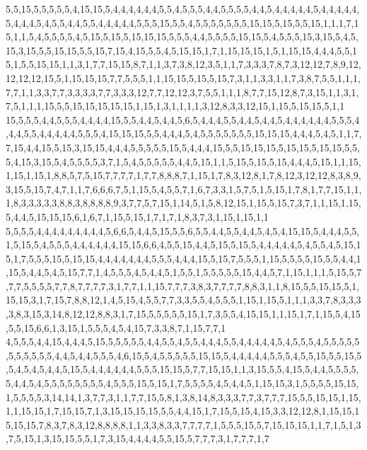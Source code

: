 5,5,15,5,5,5,5,5,4,15,15,5,4,4,4,4,4,4,5,5,4,5,5,5,4,4,5,5,5,5,4,4,5,4,4,4,4,4,5,4,4,4,4,4,5,4,4,4,5,4,5,5,4,4,5,5,4,4,4,4,4,5,5,5,15,5,5,4,5,5,5,5,5,5,5,15,15,5,15,5,5,15,1,1,1,7,15,1,1,5,4,5,5,5,5,4,5,15,5,15,5,15,15,15,5,5,5,4,4,5,5,5,5,15,15,5,4,5,5,5,15,3,15,5,4,5,15,3,15,5,5,15,15,5,5,15,7,15,4,15,5,5,4,5,15,15,1,7,1,15,15,15,1,5,1,15,15,4,4,4,5,5,15,1,5,5,15,15,1,1,3,1,7,7,15,15,8,7,1,1,3,7,3,8,12,3,5,1,1,7,3,3,3,7,8,7,3,12,12,7,8,9,12,12,12,12,15,5,1,15,15,15,7,7,5,5,5,1,1,15,15,5,15,5,15,7,3,1,1,3,3,1,1,7,3,8,7,5,5,1,1,1,7,7,1,1,3,3,7,7,3,3,3,3,7,7,3,3,3,12,7,7,12,12,3,7,5,5,1,1,1,8,7,7,15,12,8,7,3,15,1,1,3,1,7,5,1,1,1,15,5,5,15,15,15,15,15,1,15,1,3,1,1,1,1,3,12,8,3,3,12,15,1,15,5,15,15,5,1,1
15,5,5,5,4,4,5,5,5,4,4,4,4,15,5,5,4,4,5,4,4,5,6,5,4,4,4,5,5,4,4,5,4,4,5,4,4,4,4,4,4,5,5,5,4,4,4,5,5,4,4,4,4,4,5,5,5,4,15,15,15,5,5,4,4,4,5,4,5,5,5,5,5,5,5,15,15,15,4,4,4,5,4,5,1,1,7,7,15,4,4,15,5,15,3,15,15,4,4,4,5,5,5,5,5,15,5,4,4,4,15,5,5,15,15,15,5,15,15,5,15,15,5,5,5,4,15,3,15,5,4,5,5,5,5,3,7,1,5,4,5,5,5,5,5,4,4,5,15,1,1,5,15,5,15,5,15,4,4,4,5,15,1,1,15,1,15,1,15,1,8,8,5,7,5,15,7,7,7,7,1,7,7,8,8,8,7,1,15,1,7,8,3,12,8,1,7,8,12,3,12,12,8,3,8,9,3,15,5,15,7,4,7,1,1,7,6,6,6,7,5,1,15,5,4,5,5,7,1,6,7,3,3,1,5,7,5,1,5,15,1,7,8,1,7,7,15,1,1,1,8,3,3,3,3,3,8,8,3,8,8,8,8,9,3,7,7,5,7,15,1,14,5,1,5,8,12,15,1,15,5,15,7,3,7,1,1,15,1,15,5,4,4,5,15,15,15,6,1,6,7,1,15,5,15,1,7,1,7,1,8,3,7,3,1,15,1,15,1,1
5,5,5,5,4,4,4,4,4,4,4,4,4,5,6,6,5,4,4,5,15,5,5,6,5,5,4,4,5,5,4,4,5,4,5,4,15,15,5,4,4,4,5,5,1,5,15,5,4,5,5,5,4,4,4,4,4,4,15,15,6,6,4,5,5,15,4,4,5,15,5,15,5,4,4,4,4,4,5,4,5,5,4,5,15,15,1,7,5,5,5,15,5,15,15,4,4,4,4,4,4,4,5,5,5,4,4,4,15,5,15,7,5,5,5,1,15,5,5,5,5,15,5,5,4,4,1,15,5,4,4,5,4,5,15,7,7,1,4,5,5,5,4,5,4,4,5,1,5,5,1,5,5,5,5,5,15,4,4,5,7,1,15,1,1,1,5,15,5,7,7,7,5,5,5,5,7,7,8,7,7,7,7,3,1,7,7,1,1,15,7,7,7,3,8,3,7,7,7,7,8,8,3,1,1,8,15,5,5,15,15,5,1,15,15,3,1,7,15,7,8,8,12,1,4,5,15,4,5,5,7,7,3,3,5,5,4,5,5,5,1,15,1,15,5,1,1,1,3,3,7,8,3,3,3,3,8,3,15,3,14,8,12,12,8,8,3,1,7,15,5,5,5,5,5,15,1,7,3,5,5,4,15,15,1,1,15,1,7,1,15,5,4,15,5,5,15,6,6,1,3,15,1,5,5,5,4,5,4,15,7,3,3,8,7,1,15,7,7,1
4,5,5,5,4,4,15,4,4,4,5,15,5,5,5,5,5,4,4,5,5,4,5,5,4,4,4,5,5,4,4,4,4,4,5,4,5,5,5,4,5,5,5,5,5,5,5,5,5,5,5,4,4,5,4,4,5,5,5,4,6,15,5,4,5,5,5,5,5,15,15,5,4,4,4,4,4,5,5,5,4,5,5,15,5,5,15,5,5,4,5,4,5,4,4,5,15,5,4,4,4,4,4,4,5,5,5,15,15,5,7,7,15,15,1,1,3,15,5,5,4,15,5,4,4,5,5,5,5,5,4,4,5,4,5,5,5,5,5,5,5,5,4,5,5,5,15,5,15,1,7,5,5,5,5,4,5,4,4,5,1,15,15,3,1,5,5,5,5,15,15,1,5,5,5,5,3,14,14,1,3,7,7,3,1,1,7,7,15,5,8,1,3,8,14,8,3,3,3,7,7,3,7,7,7,15,5,5,15,15,1,15,1,1,15,15,1,7,15,15,7,1,3,15,15,15,15,5,5,4,4,15,1,7,15,5,15,4,15,3,3,12,12,8,1,15,15,15,15,15,7,8,3,7,8,3,12,8,8,8,8,1,1,3,3,8,3,3,7,7,7,7,1,5,5,5,15,5,7,15,15,15,1,1,7,1,5,1,3,7,5,15,1,3,15,15,5,5,1,7,3,15,4,4,4,4,5,5,15,5,7,7,7,3,1,7,7,7,1,7
